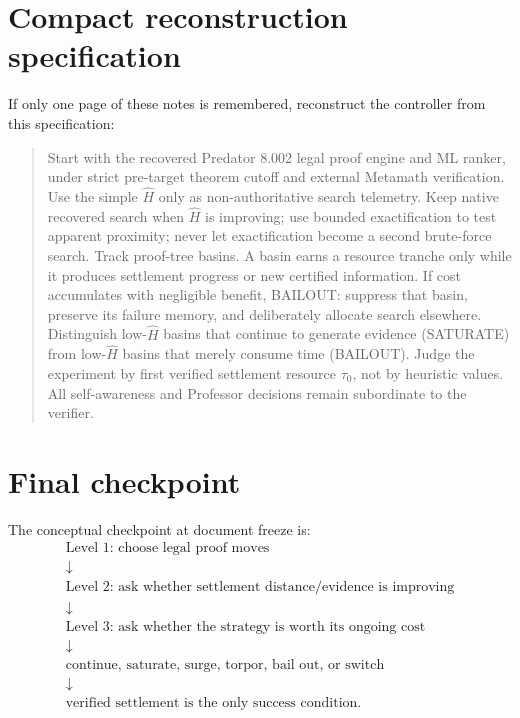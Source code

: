 \documentclass[11pt]{article}
\begin{document}
\section{Compact reconstruction specification}

If only one page of these notes is remembered, reconstruct the controller from this specification:

\begin{quote}
Start with the recovered Predator 8.002 legal proof engine and ML ranker, under strict pre-target theorem cutoff and external Metamath verification. Use the simple $\widehat H$ only as non-authoritative search telemetry. Keep native recovered search when $\widehat H$ is improving; use bounded exactification to test apparent proximity; never let exactification become a second brute-force search. Track proof-tree basins. A basin earns a resource tranche only while it produces settlement progress or new certified information. If cost accumulates with negligible benefit, BAILOUT: suppress that basin, preserve its failure memory, and deliberately allocate search elsewhere. Distinguish low-$\widehat H$ basins that continue to generate evidence (SATURATE) from low-$\widehat H$ basins that merely consume time (BAILOUT). Judge the experiment by first verified settlement resource $\tau_0$, not by heuristic values. All self-awareness and Professor decisions remain subordinate to the verifier.
\end{quote}

\section{Final checkpoint}

The conceptual checkpoint at document freeze is:
\[
\boxed{
\begin{array}{c}
\text{Level 1: choose legal proof moves}\\
\downarrow\\
\text{Level 2: ask whether settlement distance/evidence is improving}\\
\downarrow\\
\text{Level 3: ask whether the strategy is worth its ongoing cost}\\
\downarrow\\
\text{continue, saturate, surge, torpor, bail out, or switch}\\
\downarrow\\
\text{verified settlement is the only success condition.}
\end{array}}
\]
\end{document}
